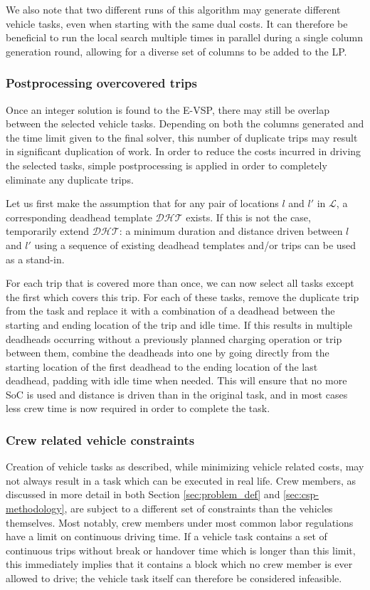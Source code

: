 \documentclass[]{article}
\begin{document}
We also note that two different runs of this algorithm may generate different vehicle tasks, even when starting with the same dual costs. It can therefore be beneficial to run the local search multiple times in parallel during a single column generation round, allowing for a diverse set of columns to be added to the LP. 

\subsubsection{Postprocessing overcovered trips} \label{sec:evsp-postprocessing}
Once an integer solution is found to the E-VSP, there may still be overlap between the selected vehicle tasks. Depending on both the columns generated and the time limit given to the final solver, this number of duplicate trips may result in significant duplication of work. In order to reduce the costs incurred in driving the selected tasks, simple postprocessing is applied in order to completely eliminate any duplicate trips. 

Let us first make the assumption that for any pair of locations $l$ and $l'$ in $\mathcal{L}$, a corresponding deadhead template $\mathcal{DHT}$ exists. If this is not the case, temporarily extend $\mathcal{DHT}$: a minimum duration and distance driven between $l$ and $l'$ using a sequence of existing deadhead templates and/or trips can be used as a stand-in. 

For each trip that is covered more than once, we can now select all tasks except the first which covers this trip. For each of these tasks, remove the duplicate trip from the task and replace it with a combination of a deadhead between the starting and ending location of the trip and idle time. If this results in multiple deadheads occurring without a previously planned charging operation or trip between them, combine the deadheads into one by going directly from the starting location of the first deadhead to the ending location of the last deadhead, padding with idle time when needed. This will ensure that no more SoC is used and distance is driven than in the original task, and in most cases less crew time is now required in order to complete the task.  

\subsubsection{Crew related vehicle constraints}
Creation of vehicle tasks as described, while minimizing vehicle related costs, may not always result in a task which can be executed in real life. Crew members, as discussed in more detail in both Section \ref{sec:problem_def} and \ref{sec:csp-methodology}, are subject to a different set of constraints than the vehicles themselves. Most notably, crew members under most common labor regulations have a limit on continuous driving time. If a vehicle task contains a set of continuous trips without break or handover time which is longer than this limit, this immediately implies that it contains a block which no crew member is ever allowed to drive; the vehicle task itself can therefore be considered infeasible.  
\end{document}
